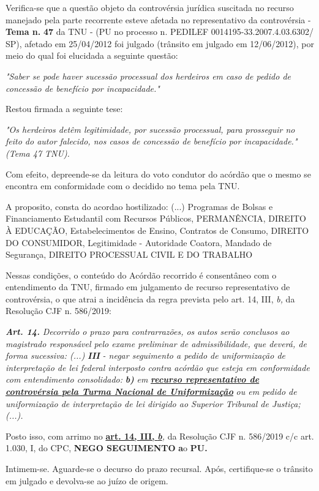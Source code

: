 \documentclass[12pt]{article}
\begin{document}
\justifying
\noindent Verifica-se que a questão objeto da controvérsia jurídica suscitada no recurso manejado pela parte recorrente esteve afetada no representativo da controvérsia - \textbf{Tema n. }\textbf{47} da TNU - (PU no processo n. PEDILEF 0014195-33.2007.4.03.6302/ SP),  afetado em 25/04/2012 foi julgado (trânsito em julgado em 12/06/2012), por meio do qual foi elucidada a seguinte questão:

\noindent \textit{"Saber se pode haver sucessão processual dos herdeiros em caso de pedido de concessão de benefício por incapacidade."}

\noindent Restou firmada a seguinte tese:

\noindent \textit{"Os herdeiros detêm legitimidade, por sucessão processual, para prosseguir no feito do autor falecido, nos casos de concessão de benefício por incapacidade." (Tema 47 TNU).}

\noindent Com efeito, depreende-se da leitura do voto condutor do acórdão que o mesmo se encontra em conformidade com o decidido no  tema pela TNU.

\noindent A proposito, consta do acordao hostilizado: (...) Programas de Bolsas e Financiamento Estudantil com Recursos Públicos, PERMANÊNCIA, DIREITO À EDUCAÇÃO, Estabelecimentos de Ensino, Contratos de Consumo, DIREITO DO CONSUMIDOR, Legitimidade - Autoridade Coatora, Mandado de Segurança, DIREITO PROCESSUAL CIVIL E DO TRABALHO

\noindent Nessas condições, o conteúdo do Acórdão recorrido é consentâneo com o entendimento da TNU, firmado em julgamento de recurso representativo de controvérsia, o que atrai a incidência da regra prevista pelo art. 14, III, \textit{b,} da Resolução CJF n. 586/2019:

\noindent \textit{\textbf{Art. 14.}}\textit{ Decorrido o prazo para contrarrazões, os autos serão conclusos ao magistrado responsável pelo exame preliminar de admissibilidade, que deverá, de forma sucessiva: (...) }\textit{\textbf{III }}\textit{- negar seguimento a pedido de uniformização de interpretação de lei federal interposto contra acórdão que esteja em conformidade com entendimento consolidado: }\textit{\textbf{b)}}\textit{ em }\uline{\textit{\textbf{recurso representativo de controvérsia pela Turma Nacional de Uniformização}}}\textit{ ou em pedido de uniformização de interpretação de lei dirigido ao Superior Tribunal de Justiça;(...).}

\noindent Posto isso, com arrimo no \uline{\textbf{art. 14, III, }}\uline{\textit{\textbf{b}}}\textit{,} da Resolução CJF n. 586/2019 c/c art. 1.030, I, do CPC, \textbf{NEGO SEGUIMENTO }\textbf{a}o\textbf{ PU}\textbf{.}

\noindent Intimem-se. Aguarde-se o decurso do prazo recursal. Após, certifique-se o trânsito em julgado e devolva-se ao juízo de origem.
\end{document}
